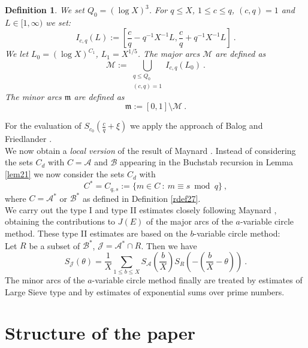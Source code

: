\documentclass{amsart}
\numberwithin{equation}{subsection}
\newtheorem{definition}[theorem]{Definition}
\begin{document}
\begin{definition}\label{rdef28}
We set $Q_0=(\log X)^3$. For $q\leq X$, $1\leq  c\leq q$, $(c, q)=1$ and $L\in [1, \infty)$ we set:
$$I_{c,q}(L):=\left[  \frac{c}{q}-q^{-1} X^{-1}L, \frac{c}{q}+q^{-1} X^{-1}L\right]\:.$$
We let $L_0=(\log X )^{C_1}$, $L_1=X^{1/5}$. The major arcs $\mathcal{M}$ are defined as 
$$\mathcal{M}:=\bigcup_{\substack{q\leq Q_0\\ (c,q)=1}} I_{c,q}(L_0)\:.$$
The minor arcs  $\mathfrak{m}$ are defined as
$$\mathfrak{m}:=[0,1]\setminus \mathcal{M}\:.$$
\end{definition}

For the evaluation of $S_{c_0}\left(\frac{c}{q}+\xi\right)$ we apply the approach of Balog and Friedlander \cite{balog}.\\
We now obtain a \textit{local version} of the result of Maynard \cite{maynard}. Instead of considering the sets $C_d$ with $C=\mathcal{A}$ and $\mathcal{B}$ appearing in the Buchstab recursion in Lemma \ref{lem21} we now consider the sets $C_d$ with 
$$C^*=C_{q,s}:=\{m\in C\::\: m\equiv s\bmod q\}\:,$$
where $C=\mathcal{A}^*$ or $\mathcal{B}^*$ as defined in Definition \ref{rdef27}.\\
We carry out the type I and type II estimates closely following Maynard \cite{maynard}, obtaining the contributions to $J(E)$ of the major arcs of the $a$-variable circle method. These type II estimates are based on the $b$-variable circle method:\\
Let $R$ be a subset of $\mathcal{B}^*$, $\mathcal{J}=\mathcal{A}^*\cap R$. Then we have
$$S_{\mathcal{J}}(\theta)=\frac{1}{X}\sum_{1\leq b\leq X}S_{\mathcal{A}}\left(\frac{b}{X}\right) S_R\left(-\left(\frac{b}{X}-\theta\right)\right)\:.$$
The minor arcs of the $a$-variable circle method finally are treated by estimates of Large Sieve type and by estimates of exponential sums over prime numbers.



\section{Structure of the paper}
\end{document}
